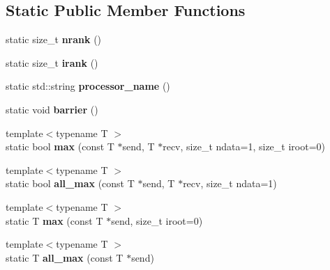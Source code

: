\subsection*{Static Public Member Functions}
\begin{DoxyCompactItemize}
\item 
static size\+\_\+t {\bfseries nrank} ()\hypertarget{structmpi_a7d43e58ab9cde786697be77606f4c49b}{}\label{structmpi_a7d43e58ab9cde786697be77606f4c49b}

\item 
static size\+\_\+t {\bfseries irank} ()\hypertarget{structmpi_ae48eaf3503c09495310a9c603456b1ce}{}\label{structmpi_ae48eaf3503c09495310a9c603456b1ce}

\item 
static std\+::string {\bfseries processor\+\_\+name} ()\hypertarget{structmpi_aa62660f0ce0da8b072095d71ca29b7ce}{}\label{structmpi_aa62660f0ce0da8b072095d71ca29b7ce}

\item 
static void {\bfseries barrier} ()\hypertarget{structmpi_a0419c570b0c53c6e1a8c959b3670938e}{}\label{structmpi_a0419c570b0c53c6e1a8c959b3670938e}

\item 
{\footnotesize template$<$typename T $>$ }\\static bool {\bfseries max} (const T $\ast$send, T $\ast$recv, size\+\_\+t ndata=1, size\+\_\+t iroot=0)\hypertarget{structmpi_a20b53a6ca73b799ec2d4c55e3c36e667}{}\label{structmpi_a20b53a6ca73b799ec2d4c55e3c36e667}

\item 
{\footnotesize template$<$typename T $>$ }\\static bool {\bfseries all\+\_\+max} (const T $\ast$send, T $\ast$recv, size\+\_\+t ndata=1)\hypertarget{structmpi_a53cfbe4d5a402525cd4e1c315c308fda}{}\label{structmpi_a53cfbe4d5a402525cd4e1c315c308fda}

\item 
{\footnotesize template$<$typename T $>$ }\\static T {\bfseries max} (const T $\ast$send, size\+\_\+t iroot=0)\hypertarget{structmpi_a0df636aed76376ebb20d6fa515b72617}{}\label{structmpi_a0df636aed76376ebb20d6fa515b72617}

\item 
{\footnotesize template$<$typename T $>$ }\\static T {\bfseries all\+\_\+max} (const T $\ast$send)\hypertarget{structmpi_a03d3a5ff490830241e18f1d46d2f0515}{}\label{structmpi_a03d3a5ff490830241e18f1d46d2f0515}


\end{DoxyCompactItemize}
